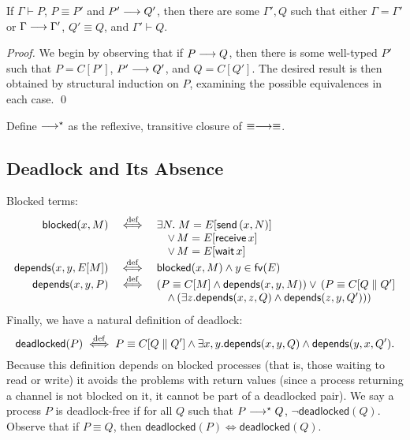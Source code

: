 \documentclass[orivec,envcountsame]{llncs}
\begin{document}
\begin{theorem}\label{thm:preservation-equiv}
  If $\Gamma \vdash P$, $P \equiv P'$ and $P' \longrightarrow Q'$, then there are some $\Gamma',Q$ such that
  either $\Gamma = \Gamma'$ or $\Gamma \longrightarrow \Gamma'$, $Q' \equiv Q$, and $\Gamma' \vdash Q$.
\end{theorem}

\begin{proof}
  We begin by observing that if $P \longrightarrow Q$, then there is some well-typed $P'$ such that $P =
  C[P']$, $P' \longrightarrow Q'$, and $Q = C[Q']$.  The desired result is then obtained by structural
  induction on $P$, examining the possible equivalences in each case. \qed
\end{proof}

Define $\longrightarrow^\star$ as the reflexive, transitive closure of $\equiv\longrightarrow\equiv$.

\subsection{Deadlock and Its Absence}

Blocked terms:
\newcommand{\blockedp}{\mathsf{blocked}}
\newcommand{\depp}{\mathsf{depends}}
\[\begin{array}{rcl}
  \blockedp(x,M) &\defiff& \exists N. \; M = E[\gvconst{send} \app (x,N)] \\
  && \quad \lor \, M = E[\gvconst{receive} \app x] \\
  && \quad \lor \, M = E[\gvconst{wait} \app x] \\
  \depp(x,y,E[M]) &\defiff& \blockedp(x,M) \land y \in \fv(E) \\
  \depp(x,y,P) &\defiff& (P \equiv C[M] \land \depp(x,y,M)) \lor \, (P \equiv C[Q \parallel Q'] \\
  && \quad \land \, (\exists z. \depp(x,z,Q) \land \depp(z,y,Q')))
\end{array}\]
Finally, we have a natural definition of deadlock:
\newcommand{\deadlockp}{\ensuremath{\mathsf{deadlocked}}}
\[
\deadlockp(P) \defiff P \equiv C[Q \parallel Q'] \land \exists x,y. \depp(x,y,Q) \land \depp(y,x,Q').
\]
Because this definition depends on blocked processes (that is, those waiting to read or write) it
avoids the problems with return values (since a process returning a channel is not blocked on it, it
cannot be part of a deadlocked pair).  We say a process $P$ is deadlock-free if for all $Q$ such
that $P \longrightarrow^\star Q$, $\lnot\deadlockp(Q)$.  Observe that if $P \equiv Q$, then $\deadlockp(P)
\iff \deadlockp(Q)$.
\end{document}
